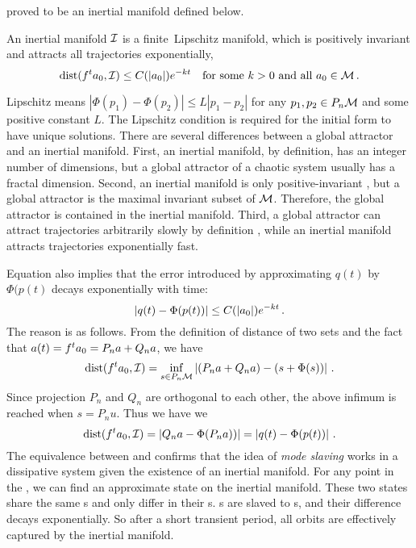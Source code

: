 proved to be an inertial manifold
defined below.
\begin{definition}
  An inertial manifold $\mathcal{I}$ is a finite\dmn\ Lipschitz manifold,
  which is positively invariant and attracts all trajectories exponentially,
  \begin{equation}
    \label{eq:im_def}
    \operatorname{dist}({f^{t}}a_0, \mathcal{I}) \le C(|a_0|)e^{-kt}\quad
    \text{for some } k > 0 \text{ and all } a_0 \in \mathcal{M}
    \,.
  \end{equation}
\end{definition}
Lipschitz means $|\Phi(p_1) - \Phi(p_2)| \le L |p_1 - p_2|$ for any
$p_1, p_2\in P_n\mathcal{M}$ and some positive
constant $L$. The Lipschitz condition
is required for the initial form  to
have unique solutions.
There are several differences between a global attractor and an inertial manifold.
First, an inertial manifold, by definition, has an integer number of dimensions, but
a global attractor of a chaotic system usually has a fractal dimension.
Second, an inertial manifold is
only positive-invariant , but a global attractor is the maximal
invariant subset of $\mathcal{M}$. Therefore, the global attractor is contained in the
inertial manifold. Third, a global attractor can attract trajectories arbitrarily slowly
by definition , while an inertial manifold attracts trajectories
exponentially fast.

Equation  also implies that the error introduced by
approximating $q(t)$ by $\Phi(p(t)$ decays exponentially with time:
\begin{equation}
  |q(t)-\Phi(p(t))| \le C(|a_0|)e^{-kt}
  \,.
  \label{eq:im_def2}
\end{equation}
The reason is as follows. From the definition of distance of two sets
 and the fact that
$a(t) = {f^{t}}a_0 = P_na + Q_na$, we have
\[
  \operatorname{dist}({f^{t}}a_0, \mathcal{I}) = \inf_{s\in P_n\mathcal{M}} \left|(P_na + Q_na) -
    (s + \Phi(s))\right|
  \,.
\]
Since projection $P_n$ and $Q_n$ are orthogonal to each other, the above
infimum is reached when $s = P_nu$. Thus we have we
\[
  \operatorname{dist}({f^{t}}a_0, \mathcal{I}) = \left|Q_na - \Phi(P_na)) \right| =
  \left|q(t) - \Phi(p(t)) \right|
  \,.
\]
The equivalence between  and  confirms that
the idea of \emph{mode slaving} works in a dissipative system given the existence
of an inertial manifold. For any point in the \statesp, we can find an
approximate state on the inertial manifold. These two states share the same \lowmode s
and only differ in their
\highmode s. \Highmode s are slaved to \lowmode s,
and their difference decays exponentially. So after a short transient
period, all orbits are effectively captured by the inertial manifold.

